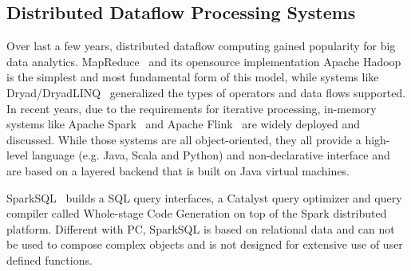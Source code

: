 \subsection{Distributed Dataflow Processing Systems}
Over last a few years, distributed dataflow computing gained
popularity for big
data analytics. MapReduce~\cite {dean2008mapreduce} and its opensource
implementation Apache Hadoop~\cite{white2009hadoop} is the simplest and
most fundamental form of this model, while systems like
Dryad/DryadLINQ~\cite{yu2008dryadlinq} generalized the types of operators and
data flows supported. In recent years, due to the requirements for
iterative processing, in-memory systems like
Apache Spark~\cite{zaharia2012resilient} and
Apache Flink~\cite{alexandrov2014stratosphere} are widely deployed and
discussed. While those systems are all object-oriented, they all provide a high-level language
(e.g. Java, Scala and Python) and non-declarative interface and are
based on a layered backend that is built on Java virtual machines.

SparkSQL~\cite{armbrust2015spark} builds a SQL query
interfaces, a Catalyst query optimizer and query compiler called Whole-stage Code Generation
on top of the Spark distributed platform. Different with PC, SparkSQL
is based on relational data and can not be used to compose complex
objects and is not designed for extensive use of user defined functions.





